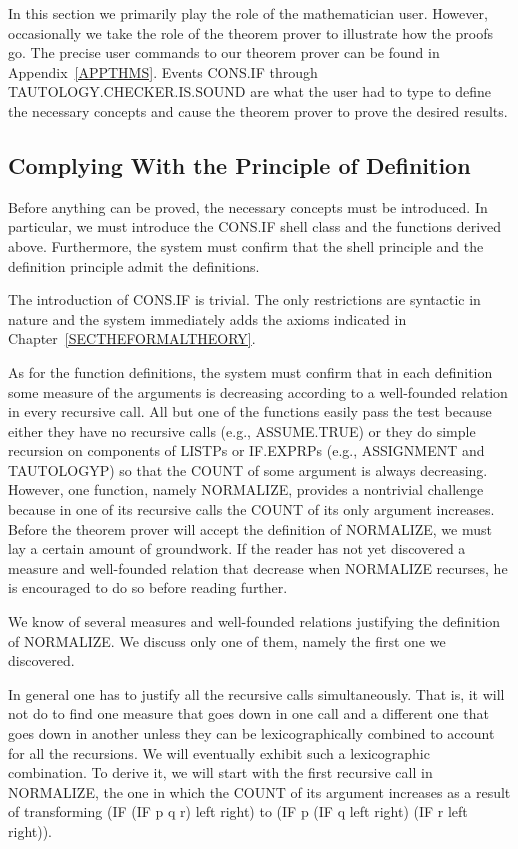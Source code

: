 \documentclass[11pt]{book}
\newcommand{\pubdefaulttextsize}{\large}
\begin{document}
In this section we  primarily play the role of the mathematician user.
However, occasionally we take
the role of the theorem prover to illustrate how the proofs
go.  The precise user commands to
our theorem prover can be found in Appendix~\ref{APPTHMS}.  Events CONS.IF through
TAU\-TOL\-OGY.CHECK\-ER.IS.SOUND are what the user had to type
to define the necessary concepts and cause the theorem prover to prove the desired results.
\subsection{Complying With the Principle of Definition}
\pubdefaulttextsize
Before anything can be proved, the necessary concepts must be introduced.  In particular, we
must introduce the CONS.IF shell class and the functions derived above.
Furthermore, the system must confirm that the shell principle and
the definition principle admit the definitions.

The introduction of CONS.IF is trivial.  The only restrictions are syntactic
in nature and the system immediately adds the axioms indicated in
Chapter~\ref{SECTHEFORMALTHEORY}.

As for the function definitions, the system must confirm that in each definition some
measure of the arguments is decreasing according to a well-founded
relation in every recursive call.
All but one of the functions
easily pass the test because either they have no
recursive calls (e.g., AS\-SUME.TRUE) or they do simple recursion on components of LISTPs or IF.EXPRPs
(e.g., ASSIGNMENT and TAUTOLOGYP) so that the COUNT of some
argument is always decreasing.
However, one function, namely NORMALIZE, provides a nontrivial challenge
because in one of its recursive calls the COUNT of its only argument
increases.  Before the theorem prover will accept the
definition of NORMALIZE, we must lay a certain amount
of groundwork.
If the reader has not yet discovered a measure and  well-founded relation
that decrease when NORMALIZE recurses, he is encouraged to do so before
reading further.

We know of several measures and well-founded relations justifying the definition of
NORMALIZE.  We discuss only one of them, namely the first one we
discovered.

In general one has to justify all the recursive calls simultaneously.
That is, it will not do to find one measure
that goes down in one call and a different one that goes down in another
unless they can be lexicographically combined to account for all the
recursions.  We will eventually exhibit such a lexicographic combination.
To derive it, we will start with the first recursive call in NORMALIZE, the
one in which the COUNT of its argument increases as a result of
transforming (IF (IF p q r) left right) to (IF p (IF q left right) (IF r left right)).
\end{document}
